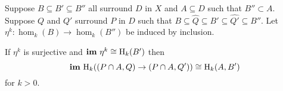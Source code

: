 \begin{theorem}
  Suppose $B\subseteq B'\subseteq B''$ all surround $D$ in $X$ and $A\subseteq D$ such that $B''\subset A$.
  Suppose $Q$ and $Q'$ surround $P$ in $D$ such that $B\subseteq \hat{Q} \subseteq B'\subseteq \hat{Q'}\subseteq B''$.
  Let $\eta^k : \hom_k(B)\to \hom_k(B'')$ be induced by inclusion.

  If $\eta^k$ is surjective and $\mathbf{im}~\eta^k\cong \mathrm{H}_k(B')$ then
  \[\mathbf{im}~\mathrm{H}_k((P\cap A, Q)\to (P\cap A, Q'))\cong \mathrm{H}_k(A, B')\]
  for $k > 0$.
\end{theorem}
